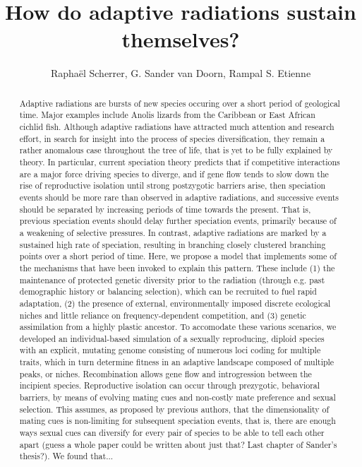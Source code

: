 \documentclass[]{article}
\title{How do adaptive radiations sustain themselves?}
\author{Rapha\"{e}l Scherrer, G. Sander van Doorn, Rampal S. Etienne}
\begin{document}
\maketitle

\begin{abstract}

Adaptive radiations are bursts of new species occuring over a short period of geological time. Major examples include Anolis lizards from the Caribbean or East African cichlid fish. Although adaptive radiations have attracted much attention and research effort, in search for insight into the process of species diversification, they remain a rather anomalous case throughout the tree of life, that is yet to be fully explained by theory. In particular, current speciation theory predicts that if competitive interactions are a major force driving species to diverge, and if gene flow tends to slow down the rise of reproductive isolation until strong postzygotic barriers arise, then speciation events should be more rare than observed in adaptive radiations, and successive events should be separated by increasing periods of time towards the present. That is, previous speciation events should delay further speciation events, primarily because of a weakening of selective pressures. In contrast, adaptive radiations are marked by a sustained high rate of speciation, resulting in branching closely clustered branching points over a short period of time. Here, we propose a model that implements some of the mechanisms that have been invoked to explain this pattern. These include (1) the maintenance of protected genetic diversity prior to the radiation (through e.g. past demographic history or balancing selection), which can be recruited to fuel rapid adaptation, (2) the presence of external, environmentally imposed discrete ecological niches and little reliance on frequency-dependent competition, and (3) genetic assimilation from a highly plastic ancestor. To accomodate these various scenarios, we developed an individual-based simulation of a sexually reproducing, diploid species with an explicit, mutating genome consisting of numerous loci coding for multiple traits, which in turn determine fitness in an adaptive landscape composed of multiple peaks, or niches. Recombination allows gene flow and introgression between the incipient species. Reproductive isolation can occur through prezygotic, behavioral barriers, by means of evolving mating cues and non-costly mate preference and sexual selection. This assumes, as proposed by previous authors, that the dimensionality of mating cues is non-limiting for subsequent speciation events, that is, there are enough ways sexual cues can diversify for every pair of species to be able to tell each other apart (guess a whole paper could be written about just that? Last chapter of Sander's thesis?). We found that...
\end{abstract}
\end{document}
